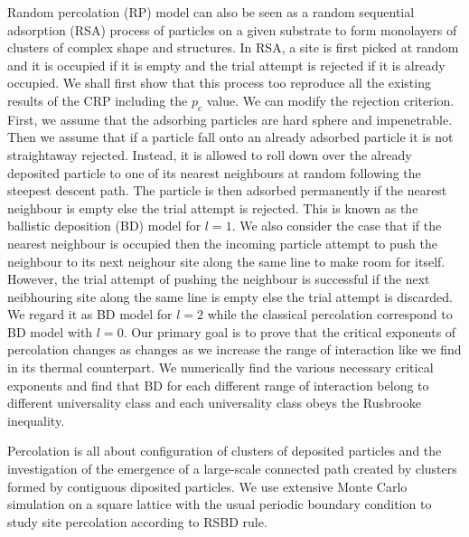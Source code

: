 	Random percolation (RP) model can also be seen as a random sequential adsorption (RSA) \cite{Jullien1992} process of particles on a given substrate to form monolayers of clusters of complex shape and structures. In RSA, a site is first picked at random and it is occupied if it is empty and the trial attempt is rejected if it is already occupied. We shall first show that this process too reproduce all the existing results of the CRP including the $p_c$ value. We can modify the rejection criterion. First, we assume that the adsorbing particles are hard sphere and impenetrable. Then we assume that if a particle fall onto an already adsorbed particle it is not straightaway rejected. Instead, it is allowed to roll down over the already deposited particle to one of its nearest neighbours at random following the steepest descent path. The particle is then adsorbed permanently if the nearest neighbour is empty else the trial attempt is rejected. This is known as the ballistic deposition (BD) \cite{Choi1995, Talbot1992, Jullien1992, Viot1993} model for $l = 1$. We also consider the case that if the nearest neighbour is occupied then the incoming particle attempt to push the neighbour to its next neighour site along the same line to make room for itself. However, the trial attempt of pushing the neighbour is successful if the next neibhouring site along the same line is empty else the trial attempt is discarded. We regard it as BD model for $l = 2$ while the classical percolation correspond to BD model with $l = 0$. Our primary goal is to prove that the critical exponents of percolation changes as changes as we increase the range of interaction like we find in its thermal counterpart. We numerically find the various necessary critical exponents and find that BD for each different range of interaction belong to different universality class and each universality class obeys the Rusbrooke inequality.
	
	Percolation is all about configuration of clusters of deposited particles and the investigation of the emergence of a large-scale connected path created by clusters formed by contiguous diposited particles. We use extensive Monte Carlo simulation on a square lattice with the usual periodic boundary condition to study site percolation according to RSBD rule.\\
	
